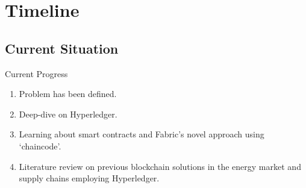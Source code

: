 \section{Timeline}
\subsection{Current Situation}
\begin{frame}{Current Progress}
    \begin{enumerate}
        \item Problem has been defined.
        \item Deep-dive on Hyperledger.
        \item Learning about smart contracts and Fabric's novel approach
              using `chaincode'.
        \item Literature review on previous blockchain solutions in the
              energy market and supply chains employing Hyperledger.
    \end{enumerate}
\end{frame}
